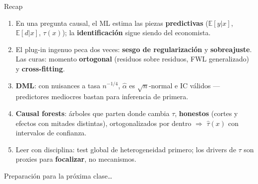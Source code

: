 \documentclass{beamer}
\newcommand{\E}{\mathbb{E}}
\newcommand{\1}{\mathbb{I}}
\begin{document}
\begin{frame}{Recap}
\small
\begin{enumerate}\itemsep6pt
  \item En una pregunta causal, el ML estima las piezas \textbf{predictivas} ($\E[y|x]$, $\E[d|x]$, $\tau(x)$); la \textbf{identificación} sigue siendo del economista.
  \item El plug-in ingenuo peca dos veces: \textbf{sesgo de regularización} y \textbf{sobreajuste}. Las curas: momento \textbf{ortogonal} (residuos sobre residuos, FWL generalizado) y \textbf{cross-fitting}.
  \item \textbf{DML}: con nuisances a tasa $n^{-1/4}$, $\hat{\alpha}$ es $\sqrt{n}$-normal e IC válidos --- predictores mediocres bastan para inferencia de primera.
  \item \textbf{Causal forests}: árboles que parten donde cambia $\tau$, \textbf{honestos} (cortes y efectos con mitades distintas), ortogonalizados por dentro $\Rightarrow$ $\hat{\tau}(x)$ con intervalos de confianza.
  \item Leer con disciplina: test global de heterogeneidad primero; los drivers de $\tau$ son proxies para \textbf{focalizar}, no mecanismos.
\end{enumerate}
\end{frame}

\begin{frame}
\vspace{2.0cm}
\Large{Preparación para la próxima clase\ldots}
\end{frame}

\end{document}
